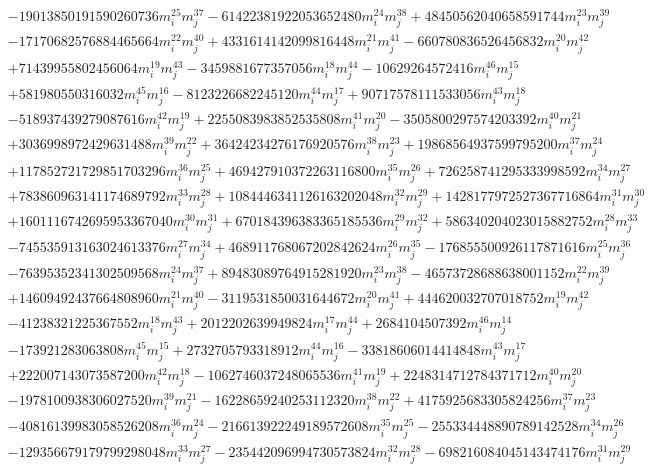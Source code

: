 {\begin{align*}
&-19013850191590260736m_i^{25}m_j^{37}-61422381922053652480m_i^{24}m_j^{38}+48450562040658591744m_i^{23}m_j^{39}\\
&-17170682576884465664m_i^{22}m_j^{40}+4331614142099816448m_i^{21}m_j^{41}-660780836526456832m_i^{20}m_j^{42}\\
&+71439955802456064m_i^{19}m_j^{43}-3459881677357056m_i^{18}m_j^{44}-10629264572416m_i^{46}m_j^{15}\\
&+581980550316032m_i^{45}m_j^{16}-8123226682245120m_i^{44}m_j^{17}+90717578111533056m_i^{43}m_j^{18}\\
&-518937439279087616m_i^{42}m_j^{19}+2255083983852535808m_i^{41}m_j^{20}-3505800297574203392m_i^{40}m_j^{21}\\
&+3036998972429631488m_i^{39}m_j^{22}+36424234276176920576m_i^{38}m_j^{23}+19868564937599795200m_i^{37}m_j^{24}\\
&+117852721729851703296m_i^{36}m_j^{25}+469427910372263116800m_i^{35}m_j^{26}+726258741295333998592m_i^{34}m_j^{27}\\
&+783860963141174689792m_i^{33}m_j^{28}+1084446341126163202048m_i^{32}m_j^{29}+1428177972527367716864m_i^{31}m_j^{30}\\
&+1601116742695953367040m_i^{30}m_j^{31}+670184396383365185536m_i^{29}m_j^{32}+586340204023015882752m_i^{28}m_j^{33}\\
&-745535913163024613376m_i^{27}m_j^{34}+468911768067202842624m_i^{26}m_j^{35}-176855500926117871616m_i^{25}m_j^{36}\\
&-76395352341302509568m_i^{24}m_j^{37}+89483089764915281920m_i^{23}m_j^{38}-46573728688638001152m_i^{22}m_j^{39}\\
&+14609492437664808960m_i^{21}m_j^{40}-3119531850031644672m_i^{20}m_j^{41}+444620032707018752m_i^{19}m_j^{42}\\
&-41238321225367552m_i^{18}m_j^{43}+2012202639949824m_i^{17}m_j^{44}+2684104507392m_i^{46}m_j^{14}\\
&-173921283063808m_i^{45}m_j^{15}+2732705793318912m_i^{44}m_j^{16}-33818606014414848m_i^{43}m_j^{17}\\
&+222007143073587200m_i^{42}m_j^{18}-1062746037248065536m_i^{41}m_j^{19}+2248314712784371712m_i^{40}m_j^{20}\\
&-1978100938306027520m_i^{39}m_j^{21}-16228659240253112320m_i^{38}m_j^{22}+4175925683305824256m_i^{37}m_j^{23}\\
&-40816139983058526208m_i^{36}m_j^{24}-216613922249189572608m_i^{35}m_j^{25}-255334448890789142528m_i^{34}m_j^{26}\\
&-129356679179799298048m_i^{33}m_j^{27}-235442096994730573824m_i^{32}m_j^{28}-698216084045143474176m_i^{31}m_j^{29}\\

\end{align*}}
